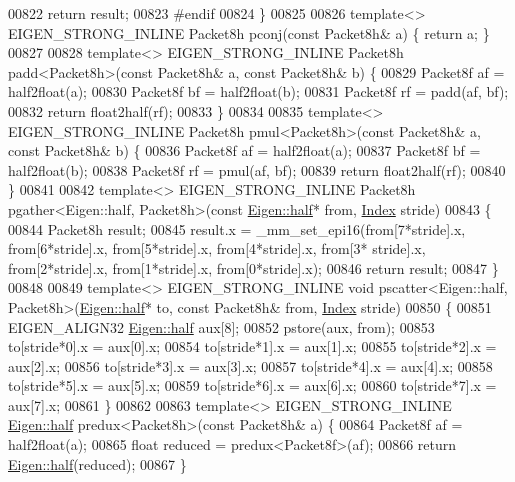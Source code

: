 \begin{DoxyCode}
00822   \textcolor{keywordflow}{return} result;
00823 \textcolor{preprocessor}{#endif}
00824 \}
00825 
00826 \textcolor{keyword}{template}<> EIGEN\_STRONG\_INLINE Packet8h pconj(\textcolor{keyword}{const} Packet8h& a) \{ \textcolor{keywordflow}{return} a; \}
00827 
00828 \textcolor{keyword}{template}<> EIGEN\_STRONG\_INLINE Packet8h padd<Packet8h>(\textcolor{keyword}{const} Packet8h& a, \textcolor{keyword}{const} Packet8h& b) \{
00829   Packet8f af = half2float(a);
00830   Packet8f bf = half2float(b);
00831   Packet8f rf = padd(af, bf);
00832   \textcolor{keywordflow}{return} float2half(rf);
00833 \}
00834 
00835 \textcolor{keyword}{template}<> EIGEN\_STRONG\_INLINE Packet8h pmul<Packet8h>(\textcolor{keyword}{const} Packet8h& a, \textcolor{keyword}{const} Packet8h& b) \{
00836   Packet8f af = half2float(a);
00837   Packet8f bf = half2float(b);
00838   Packet8f rf = pmul(af, bf);
00839   \textcolor{keywordflow}{return} float2half(rf);
00840 \}
00841 
00842 \textcolor{keyword}{template}<> EIGEN\_STRONG\_INLINE Packet8h pgather<Eigen::half, Packet8h>(\textcolor{keyword}{const} 
      \hyperlink{struct_eigen_1_1half}{Eigen::half}* from, \hyperlink{namespace_eigen_a62e77e0933482dafde8fe197d9a2cfde}{Index} stride)
00843 \{
00844   Packet8h result;
00845   result.x = \_mm\_set\_epi16(from[7*stride].x, from[6*stride].x, from[5*stride].x, from[4*stride].x, from[3*
      stride].x, from[2*stride].x, from[1*stride].x, from[0*stride].x);
00846   \textcolor{keywordflow}{return} result;
00847 \}
00848 
00849 \textcolor{keyword}{template}<> EIGEN\_STRONG\_INLINE \textcolor{keywordtype}{void} pscatter<Eigen::half, Packet8h>(\hyperlink{struct_eigen_1_1half}{Eigen::half}* to, \textcolor{keyword}{const} 
      Packet8h& from, \hyperlink{namespace_eigen_a62e77e0933482dafde8fe197d9a2cfde}{Index} stride)
00850 \{
00851   EIGEN\_ALIGN32 \hyperlink{struct_eigen_1_1half}{Eigen::half} aux[8];
00852   pstore(aux, from);
00853   to[stride*0].x = aux[0].x;
00854   to[stride*1].x = aux[1].x;
00855   to[stride*2].x = aux[2].x;
00856   to[stride*3].x = aux[3].x;
00857   to[stride*4].x = aux[4].x;
00858   to[stride*5].x = aux[5].x;
00859   to[stride*6].x = aux[6].x;
00860   to[stride*7].x = aux[7].x;
00861 \}
00862 
00863 \textcolor{keyword}{template}<> EIGEN\_STRONG\_INLINE \hyperlink{struct_eigen_1_1half}{Eigen::half} predux<Packet8h>(\textcolor{keyword}{const} Packet8h& a) \{
00864   Packet8f af = half2float(a);
00865   \textcolor{keywordtype}{float} reduced = predux<Packet8f>(af);
00866   \textcolor{keywordflow}{return} \hyperlink{struct_eigen_1_1half}{Eigen::half}(reduced);
00867 \}

\end{DoxyCode}
